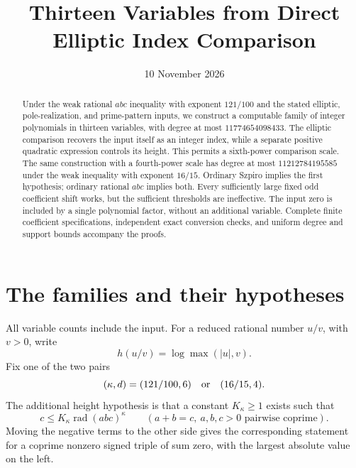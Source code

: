 \documentclass[11pt,a4paper]{article}
\title{Thirteen Variables from Direct Elliptic Index Comparison}
\author{}\date{10 November 2026}
\begin{document}
\maketitle
\begin{abstract}
Under the weak rational $abc$ inequality with exponent $121/100$
and the stated elliptic, pole-realization, and prime-pattern inputs,
we construct a computable family of integer polynomials in thirteen
variables, with degree at most $11774654098433$.
The elliptic comparison recovers the input itself as an integer
index, while a separate positive quadratic expression controls its
height. This permits a sixth-power comparison scale. The same
construction with a fourth-power scale has degree at most
$11212784195585$ under the weak inequality with exponent $16/15$.
Ordinary Szpiro implies the first hypothesis; ordinary rational
$abc$ implies both. Every sufficiently large fixed odd coefficient
shift works, but the sufficient thresholds are ineffective.
The input zero is included by a single polynomial factor, without
an additional variable. Complete finite coefficient specifications,
independent exact conversion checks, and uniform degree and support
bounds accompany the proofs.
\end{abstract}

\section{The families and their hypotheses}

All variable counts include the input. For a reduced rational number
$u/v$, with $v>0$, write
\[
 h(u/v)=\log\max(|u|,v).
\]
Fix one of the two pairs
\[
             (\kappa,d)=(121/100,6)\quad\hbox{or}\quad(16/15,4).
\]
The additional height hypothesis is that a constant $K_\kappa\ge1$
exists such that
\begin{equation}\label{eq:weak-abc}
 c\le K_\kappa\operatorname{rad}(abc)^\kappa
 \qquad(a+b=c,\ a,b,c>0\text{ pairwise coprime}).
\end{equation}
Moving the negative terms to the other side gives the corresponding
statement for a coprime nonzero signed triple of sum zero, with the
largest absolute value on the left.
\end{document}
